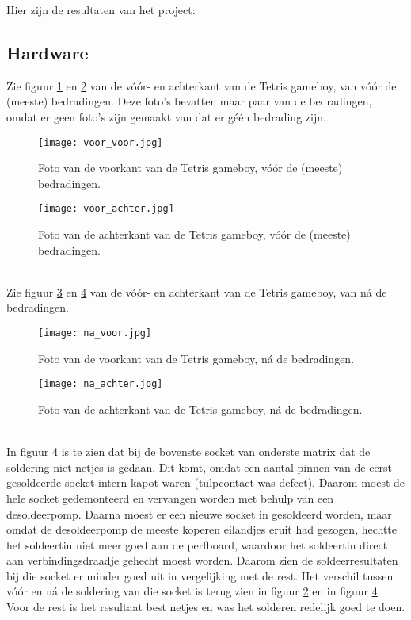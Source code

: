 Hier zijn de resultaten van het project:
\subsection{Hardware}
\label{subsec:results:hardware}
Zie figuur \ref{fig:voorvoor} en \ref{fig:voorachter} van de vóór- en achterkant van de Tetris gameboy, van vóór de (meeste) bedradingen. Deze foto's bevatten maar paar van de bedradingen, omdat er geen foto's zijn gemaakt van dat er géén bedrading zijn. 
\begin{figure}[h]
    \centering
    \texttt{[image: voor\_voor.jpg]}
    \caption{Foto van de voorkant van de Tetris gameboy, vóór de (meeste) bedradingen.}
    \label{fig:voorvoor}
\end{figure}
\begin{figure}[h]
    \centering
    \texttt{[image: voor\_achter.jpg]}
    \caption{Foto van de achterkant van de Tetris gameboy, vóór de (meeste) bedradingen.}
    \label{fig:voorachter}
\end{figure}
\pagebreak
\\
Zie figuur \ref{fig:navoor} en \ref{fig:naachter} van de vóór- en achterkant van de Tetris gameboy, van ná de bedradingen.
\begin{figure}[h]
    \centering
    \texttt{[image: na\_voor.jpg]}
    \caption{Foto van de voorkant van de Tetris gameboy, ná de bedradingen.}
    \label{fig:navoor}
\end{figure}
\begin{figure}[h]
    \centering
    \texttt{[image: na\_achter.jpg]}
    \caption{Foto van de achterkant van de Tetris gameboy, ná de bedradingen.}
    \label{fig:naachter}
\end{figure}\\
In figuur \ref{fig:naachter} is te zien dat bij de bovenste socket van onderste matrix dat de soldering niet netjes is gedaan. 
Dit komt, omdat een aantal pinnen van de eerst gesoldeerde socket intern kapot waren (tulpcontact was defect). Daarom moest de hele socket gedemonteerd en vervangen worden met behulp van een desoldeerpomp. 
Daarna moest er een nieuwe socket in gesoldeerd worden, maar omdat de desoldeerpomp de meeste koperen eilandjes eruit had gezogen, hechtte het soldeertin niet meer goed aan de perfboard, waardoor het soldeertin direct aan verbindingsdraadje gehecht moest worden. Daarom zien de soldeerresultaten bij die socket er minder goed uit in vergelijking met de rest. 
Het verschil tussen vóór en ná de soldering van die socket is terug zien in figuur \ref{fig:voorachter} en in figuur \ref{fig:naachter}. Voor de rest is het resultaat best netjes en was het solderen redelijk goed te doen. 
